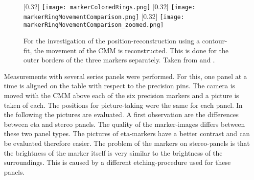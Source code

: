 \documentclass[
twoside,            %
BCOR1.4cm,          %
10pt,               %
headings=normal,    %
headsepline,        %
clearplainpage,		%
final,              %
div=14,
open=right,
bibliography=toc
]{scrreprt}
\begin{document}
\begin{figure}[!h]
	\centering
	[0.32\textwidth] 
	{\texttt{[image: markerColoredRings.png]}}
	\hfill
	[0.32\textwidth]
	{\texttt{[image: markerRingMovementComparison.png]}}
	\hfill
	[0.32\textwidth]
	{\texttt{[image: markerRingMovementComparison\_zoomed.png]}}
	\caption{
		For the investigation of the position-reconstruction using a contour-fit, the movement of the CMM is reconstructed.
		This is done for the outer borders of the three markers separately.
		Taken from \cite{feilThesis} and \cite{neubertThesis}.
	}
\end{figure}

Measurements with several series panels were performed.
For this, one panel at a time is aligned on the table with respect to the precision pins.
The camera is moved with the CMM above each of the six precision markers and a picture is taken of each.
The positions for picture-taking were the same for each panel.
In the following the pictures are evaluated.
A first observation are the differences between eta and stereo panels.
The quality of the marker-images differs between these two panel types.
The pictures of eta-markers have a better contrast and can be evaluated therefore easier.
The problem of the markers on stereo-panels is that the brightness of the marker itself is very similar to the brightness of the surroundings.
This is caused by a different etching-procedure used for these panels.
\end{document}
